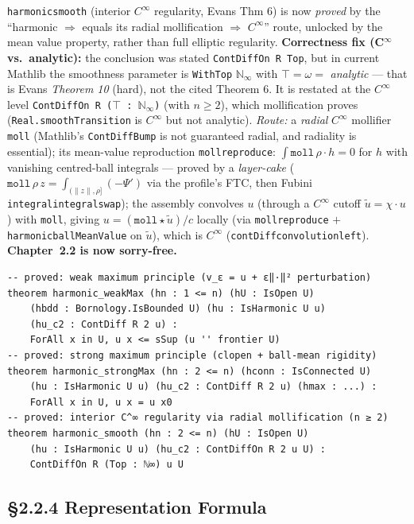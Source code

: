 ﻿\documentclass[12pt, a4paper]{article}
\renewcommand{\_}{\origunderscore\allowbreak}
\theoremstyle{definition}
\theoremstyle{plain}
\begin{document}
\texttt{harmonic\_smooth} (interior $C^\infty$ regularity, Evans Thm 6) is now \emph{proved} by
the ``harmonic $\Rightarrow$ equals its radial mollification $\Rightarrow$ $C^\infty$'' route,
unlocked by the mean value property, rather than full elliptic regularity. \textbf{Correctness
fix (C$^\infty$ vs.\ analytic):} the conclusion was stated \texttt{ContDiffOn R Top}, but in
current Mathlib the smoothness parameter is \texttt{WithTop} $\mathbb{N}_\infty$ with
$\top = \omega = $ \emph{analytic} --- that is Evans \emph{Theorem 10} (hard), not the cited
Theorem 6. It is restated at the $C^\infty$ level \texttt{ContDiffOn R ($\top$ : $\mathbb{N}_\infty$)}
(with $n \ge 2$), which mollification proves (\texttt{Real.smoothTransition} is $C^\infty$ but not
analytic). \emph{Route:} a \emph{radial} $C^\infty$ mollifier \texttt{moll} (Mathlib's
\texttt{ContDiffBump} is not guaranteed radial, and radiality is essential); its mean-value
reproduction \texttt{moll\_reproduce}: $\int \texttt{moll}\,\rho \cdot h = 0$ for $h$ with vanishing
centred-ball integrals --- proved by a \emph{layer-cake} ($\texttt{moll}\,\rho\,z =
\int_{(\lVert z\rVert,\rho]}(-\Psi')$ via the profile's FTC, then Fubini
\texttt{integral\_integral\_swap}); the assembly convolves $u$ (through a $C^\infty$ cutoff $\tilde
u = \chi\cdot u$) with \texttt{moll}, giving $u = (\texttt{moll} \star \tilde u)/c$ locally (via
\texttt{moll\_reproduce} $+$ \texttt{harmonic\_ballMeanValue} on $\tilde u$), which is $C^\infty$
(\texttt{contDiff\_convolution\_left}). \textbf{Chapter~2.2 is now sorry-free.}

\begin{lstlisting}[caption={Maximum principles and regularity}]
-- proved: weak maximum principle (v_ε = u + ε‖·‖² perturbation)
theorem harmonic_weakMax (hn : 1 <= n) (hU : IsOpen U)
    (hbdd : Bornology.IsBounded U) (hu : IsHarmonic U u)
    (hu_c2 : ContDiff R 2 u) :
    ForAll x in U, u x <= sSup (u '' frontier U)
-- proved: strong maximum principle (clopen + ball-mean rigidity)
theorem harmonic_strongMax (hn : 2 <= n) (hconn : IsConnected U)
    (hu : IsHarmonic U u) (hu_c2 : ContDiff R 2 u) (hmax : ...) :
    ForAll x in U, u x = u x0
-- proved: interior C^∞ regularity via radial mollification (n ≥ 2)
theorem harmonic_smooth (hn : 2 <= n) (hU : IsOpen U)
    (hu : IsHarmonic U u) (hu_c2 : ContDiffOn R 2 u U) :
    ContDiffOn R (Top : ℕ∞) u U
\end{lstlisting}

\subsection{§2.2.4 Representation Formula}
\end{document}
